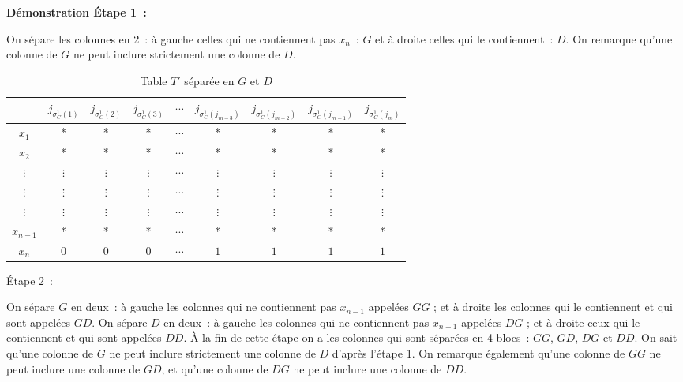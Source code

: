 \documentclass[a4paper]{report}
\renewcommand{\textbf}[1]{\begingroup\bfseries\mathversion{bold}#1\endgroup}
\newenvironment{preuve}{\textbf{Démonstration}}{}
\begin{document}
\begin{preuve}
\'Etape 1~:

On sépare les colonnes en 2~: à gauche celles qui ne contiennent pas $x_n$~: $G$ et à droite celles qui le 
contiennent~: $D$.
On remarque qu'une colonne de $G$ ne peut inclure strictement une colonne de $D$.

\begin{table}[htb]
 \centering

\begin{tabular}{ |c | c | c |c | c | c | c | c |c |}
\hline
 & $j_{\sigma_{C}^{1}(1)}$ & $j_{\sigma_{C}^{1}(2)}$ & $j_{\sigma_{C}^{1}(3)}$ & $\cdots$  & $j_{\sigma_{C}^{1}(j_{m - 3})}$ & $j_{\sigma_{C}^{1}(j_{m - 2})}$ & $j_{\sigma_{C}^{1}(j_{m - 1})}$ & $j_{\sigma_{C}^{1}(j_{m})}$\\
\hline
$x_1$ & * & * & * & $\cdots$ & * & * & * & *\\
\hline
$x_2$ & * & * & * & $\cdots$ & * & * & * & *\\
\hline
$\vdots$ & $\vdots$ & $\vdots$ & $\vdots$ & $\cdots$ & $\vdots$ & $\vdots$ & $\vdots$ & $\vdots$\\
\hline
$\vdots$ & $\vdots$ & $\vdots$ & $\vdots$ & $\cdots$ & $\vdots$ & $\vdots$ & $\vdots$ & $\vdots$\\
\hline
$\vdots$ & $\vdots$ & $\vdots$ & $\vdots$ & $\cdots$ & $\vdots$ & $\vdots$ & $\vdots$ & $\vdots$\\
\hline
$x_{n-1}$ & * & * & * & $\cdots$ & * & * & * & *\\
\hline
$x_n$ & $0$ & $0$ & $0$ & $\cdots$ & $1$ & $1$ & $1$ & $1$\\
\hline
\end{tabular}
\caption{Table $T'$ séparée en $G$ et $D$ }
\end{table}

\'Etape 2~:

On sépare $G$ en deux~: à gauche les colonnes qui ne contiennent pas $x_{n-1}$ appelées $GG$ ; et  à droite les colonnes qui le contiennent et qui sont appelées $GD$. 
On sépare $D$ en deux~: à gauche les colonnes qui ne contiennent pas $x_{n-1}$ appelées $DG$ ; et à droite ceux qui le contiennent et qui sont appelées $DD$.
À la fin de cette étape on a les colonnes qui sont séparées en 4 blocs~: $GG$, $GD$, $DG$ et $DD$. 
On sait qu'une colonne de $G$ ne peut inclure strictement une colonne de $D$ d'après l'étape 1. On remarque également qu'une colonne 
de $GG$ ne peut inclure une colonne de $GD$, et qu'une colonne de $DG$ ne peut inclure une colonne de $DD$.


\end{preuve}
\end{document}
